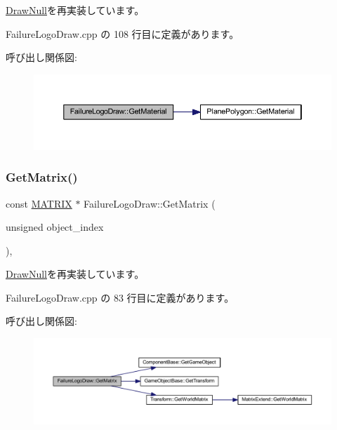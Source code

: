 \mbox{\hyperlink{class_draw_null_a84969d22d3436986f214e9896fe44fc6}{Draw\+Null}}を再実装しています。



 Failure\+Logo\+Draw.\+cpp の 108 行目に定義があります。

呼び出し関係図\+:\nopagebreak
\begin{figure}[H]
\begin{center}
\leavevmode
\includegraphics[width=350pt]{class_failure_logo_draw_aaac019fb396a354ef0f823ed2bd72322_cgraph}
\end{center}
\end{figure}
\mbox{\label{class_failure_logo_draw_aefc4be9e6ead4d90a5fc9c22cc07fe92}} 
\subsubsection{\texorpdfstring{Get\+Matrix()}{GetMatrix()}}
{\footnotesize\ttfamily const \mbox{\hyperlink{_vector3_d_8h_a032295cd9fb1b711757c90667278e744}{M\+A\+T\+R\+IX}} $\ast$ Failure\+Logo\+Draw\+::\+Get\+Matrix (\begin{DoxyParamCaption}\item[{unsigned}]{object\+\_\+index }\end{DoxyParamCaption})\hspace{0.3cm}{\ttfamily [override]}, {\ttfamily [virtual]}}



\mbox{\hyperlink{class_draw_null_adede079e9c11a756090740b20bb43022}{Draw\+Null}}を再実装しています。



 Failure\+Logo\+Draw.\+cpp の 83 行目に定義があります。

呼び出し関係図\+:\nopagebreak
\begin{figure}[H]
\begin{center}
\leavevmode
\includegraphics[width=350pt]{class_failure_logo_draw_aefc4be9e6ead4d90a5fc9c22cc07fe92_cgraph}
\end{center}
\end{figure}
\mbox{\label{class_failure_logo_draw_aa7164b6f5788416788482893aa747d59}} 
